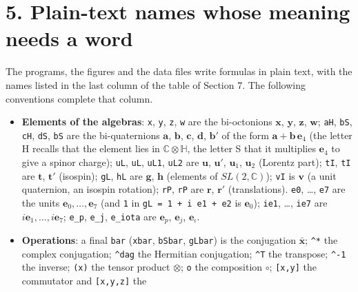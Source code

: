 \documentclass[
  10pt,
]{article}
\providecommand{\tightlist}{%
  \setlength{\itemsep}{0pt}\setlength{\parskip}{0pt}}
\begin{document}
\hypertarget{plain-text-names-whose-meaning-needs-a-word}{%
\section{5. Plain-text names whose meaning needs a
word}\label{plain-text-names-whose-meaning-needs-a-word}}

The programs, the figures and the data files write formulas in plain
text, with the names listed in the last column of the table of Section
7. The following conventions complete that column.

\begin{itemize}
\tightlist
\item
  \textbf{Elements of the algebras}: \texttt{x}, \texttt{y}, \texttt{z},
  \texttt{w} are the bi-octonions \(\mathbf x\), \(\mathbf y\),
  \(\mathbf z\), \(\mathbf w\); \texttt{aH}, \texttt{bS}, \texttt{cH},
  \texttt{dS}, \texttt{bS\textquotesingle{}} are the bi-quaternions
  \(\mathbf a\), \(\mathbf b\), \(\mathbf c\), \(\mathbf d\),
  \(\mathbf b'\) of the form \(\mathbf a+\mathbf b\,\mathbf e_4\) (the
  letter H recalls that the element lies in
  \(\mathbb C\otimes\mathbb H\), the letter S that it multiplies
  \(\mathbf e_4\) to give a spinor charge); \texttt{uL},
  \texttt{uL\textquotesingle{}}, \texttt{uL1}, \texttt{uL2} are
  \(\mathbf u\), \(\mathbf u'\), \(\mathbf u_1\), \(\mathbf u_2\)
  (Lorentz part); \texttt{tI}, \texttt{tI\textquotesingle{}} are
  \(\mathbf t\), \(\mathbf t'\) (isospin); \texttt{gL}, \texttt{hL} are
  \(\mathbf g\), \(\mathbf h\) (elements of \(SL(2,\mathbb C)\));
  \texttt{vI} is \(\mathbf v\) (a unit quaternion, an isospin rotation);
  \texttt{rP}, \texttt{rP\textquotesingle{}} are \(\mathbf r\),
  \(\mathbf r'\) (translations). \texttt{e0}, \ldots, \texttt{e7} are
  the units \(\mathbf e_0,\dots,\mathbf e_7\) (and \texttt{1} in
  \texttt{gL\ =\ 1\ +\ i\ e1\ +\ e2} is \(\mathbf e_0\)); \texttt{ie1},
  \ldots, \texttt{ie7} are \(i\mathbf e_1,\dots,i\mathbf e_7\);
  \texttt{e\_p}, \texttt{e\_j}, \texttt{e\_iota} are \(\mathbf e_p\),
  \(\mathbf e_j\), \(\mathbf e_\iota\).
\item
  \textbf{Operations}: a final \texttt{bar} (\texttt{xbar},
  \texttt{bSbar}, \texttt{gLbar}) is the conjugation
  \(\bar{\mathbf x}\); \texttt{\^{}*} the complex conjugation;
  \texttt{\^{}dag} the Hermitian conjugation; \texttt{\^{}T} the
  transpose; \texttt{\^{}-1} the inverse; \texttt{(x)} the tensor
  product \(\otimes\); \texttt{o} the composition \(\circ\);
  \texttt{{[}x,y{]}} the commutator and \texttt{{[}x,y,z{]}} the

\end{itemize}
\end{document}
